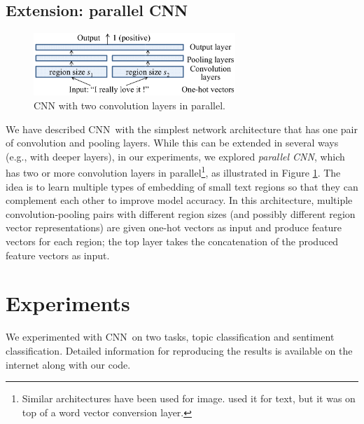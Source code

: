 \documentclass[11pt,letterpaper]{article}
\newcommand{\cnn}{CNN}
\newcommand{\bongram}{bag-of-$n$-gram}
\begin{document}
\subsection{Extension: parallel \cnn}

\begin{figure}
\centering
\includegraphics[width=3in]{multilaycnn}
\caption{\label{fig:multilaycnn} \footnotesize %
CNN with two convolution layers in parallel.  
}
\end{figure}

We have described \cnn\ with the simplest network architecture that has one pair of 
convolution and pooling layers.  While this can be extended in several ways (e.g., 
with deeper layers), in our experiments, 
we explored {\em parallel \cnn}, which has 
two or more convolution layers in parallel\footnote{
  Similar architectures have been used for image.  
   used it for text, but it was on top of a word vector conversion layer. 
}, 
as illustrated in Figure \ref{fig:multilaycnn}. 
The idea is to learn multiple types of embedding of small text regions so that they can complement 
each other to improve model accuracy.  
In this architecture, 
multiple convolution-pooling pairs with different region sizes (and possibly 
different region vector representations) are given one-hot vectors as input and produce 
feature vectors for each region; the top layer takes the concatenation of the produced 
feature vectors as input.  

\section{Experiments}
\label{sec:experiment} 

We experimented with 
\cnn\ on two tasks, topic classification and sentiment classification. 
%
Detailed information for reproducing the results 
is available on the internet along with our code.  

\end{document}
